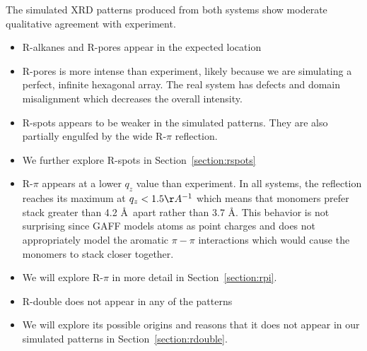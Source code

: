 \documentclass{article}
\begin{document}
  The simulated XRD patterns produced from both systems show moderate qualitative 
  agreement with experiment. 
  \begin{itemize}
  		\item R-alkanes and R-pores appear in the expected location
  		\item R-pores is more intense than experiment, likely because we are simulating a 
		perfect, infinite hexagonal array. The real system has defects and domain misalignment
	    which decreases the overall intensity.
    	\item R-spots appears to be weaker in the simulated patterns. They are also partially 
	    engulfed by the wide R-$\pi$ reflection.
	    \item We further explore R-spots in Section~\ref{section:rspots}  
        \item R-$\pi$ appears at a lower $q_z$ value than experiment. In all systems, the
	    reflection reaches its maximum at $q_z < 1.5 \AA^{-1}$ which means that monomers
	    prefer stack greater than 4.2 \AA~apart rather than 3.7 \AA. This behavior is not
	    surprising since GAFF models atoms as point charges and does not appropriately model 
	    the aromatic $\pi-\pi$ interactions which would cause the monomers to stack closer
	    together.
	    \item We will explore R-$\pi$ in more detail in Section~\ref{section:rpi}.
	    \item R-double does not appear in any of the patterns
	    \item We will explore its possible origins and reasons that it does not appear in our
	    simulated patterns in Section~\ref{section:rdouble}.
  \end{itemize}
  
\end{document}
